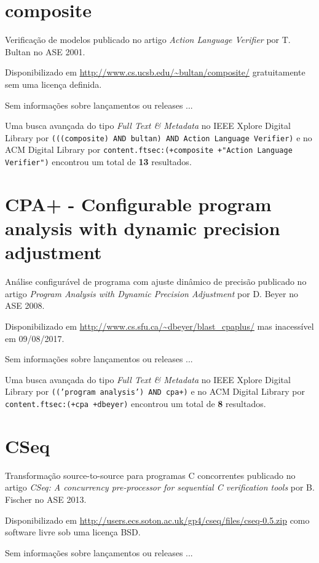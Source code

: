 \section{composite}

Verificação de modelos
publicado no artigo {\it Action Language Verifier}
por T. Bultan
no ASE 2001.

Disponibilizado em \url{http://www.cs.ucsb.edu/~bultan/composite/}
gratuitamente
sem uma licença definida.

Sem informações sobre lançamentos ou releases ...


Uma busca avançada do tipo {\it Full Text \& Metadata} no IEEE Xplore Digital Library por
\texttt{(((composite) AND bultan) AND Action Language Verifier)}
e no ACM Digital Library por
\texttt{content.ftsec:(+composite +"Action Language Verifier")}
encontrou um total de
{\bf 13}
resultados.

\section{CPA+ - Configurable program analysis with dynamic precision adjustment}

Análise configurável de programa com ajuste dinâmico de precisão
publicado no artigo {\it Program Analysis with Dynamic Precision Adjustment}
por D. Beyer
no ASE 2008.

Disponibilizado em \url{http://www.cs.sfu.ca/~dbeyer/blast_cpaplus/}
mas inacessível em 09/08/2017.

Sem informações sobre lançamentos ou releases ...


Uma busca avançada do tipo {\it Full Text \& Metadata} no IEEE Xplore Digital Library por
\texttt{(('program analysis') AND cpa+)}
e no ACM Digital Library por
\texttt{content.ftsec:(+cpa +dbeyer)}
encontrou um total de
{\bf 8}
resultados.

\section{CSeq}

Transformação source-to-source para programas C concorrentes
publicado no artigo {\it CSeq: A concurrency pre-processor for sequential C verification tools}
por B. Fischer
no ASE 2013.

Disponibilizado em \url{http://users.ecs.soton.ac.uk/gp4/cseq/files/cseq-0.5.zip}
como software livre
sob uma licença BSD.

Sem informações sobre lançamentos ou releases ...


